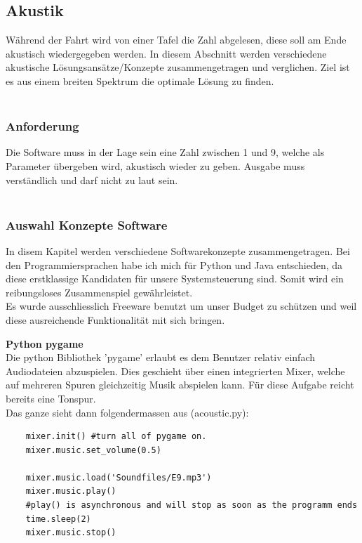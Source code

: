 \documentclass[../../../main.tex]{subfiles}
\begin{document}
    \subsection{Akustik}
    Während der Fahrt wird von einer Tafel die Zahl abgelesen, diese soll am Ende akustisch wiedergegeben werden.
    In diesem Abschnitt werden verschiedene akustische Lösungsansätze/Konzepte zusammengetragen und verglichen.
    Ziel ist es aus einem breiten Spektrum die optimale Lösung zu finden.\\
    \\

    \subsubsection{Anforderung}
    Die Software muss in der Lage sein eine Zahl zwischen 1 und 9, welche als Parameter übergeben wird, akustisch wieder zu geben.
    Ausgabe muss verständlich und darf nicht zu laut sein.\\
    \\

    \subsubsection{Auswahl Konzepte Software}
    In disem Kapitel werden verschiedene Softwarekonzepte zusammengetragen. Bei den Programmiersprachen habe ich mich für Python
    und Java entschieden, da diese erstklassige Kandidaten für unsere Systemsteuerung sind.
    Somit wird ein reibungsloses Zusammenspiel gewährleistet.\\

    Es wurde ausschliesslich Freeware benutzt um unser Budget zu schützen und weil diese ausreichende Funktionalität mit sich bringen.

    \textbf{Python pygame}\\
    Die python Bibliothek 'pygame' erlaubt es dem Benutzer relativ einfach Audiodateien abzuspielen.
    Dies geschieht über einen integrierten Mixer, welche auf mehreren Spuren gleichzeitig Musik abspielen kann.
    Für diese Aufgabe reicht bereits eine Tonspur.\\

    Das ganze sieht dann folgendermassen aus (acoustic.py):
    \begin{lstlisting}
    mixer.init() #turn all of pygame on.
    mixer.music.set_volume(0.5)

    mixer.music.load('Soundfiles/E9.mp3')
    mixer.music.play()
    #play() is asynchronous and will stop as soon as the programm ends
    time.sleep(2)
    mixer.music.stop()
    \end{lstlisting}
\end{document}
